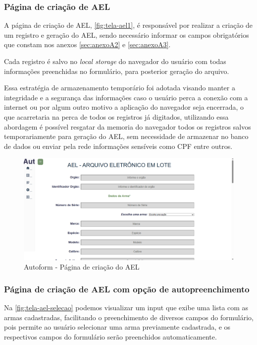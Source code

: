 \subsubsection{Página de criação de AEL}
A página de criação de AEL, \autoref{fig:tela-ael1}, é responsável por realizar a criação de um registro e geração do AEL, sendo necessário informar os campos obrigatórios que constam nos anexos \autoref{sec:anexoA2} e \autoref{sec:anexoA3}.

Cada registro é salvo no \textit{local storage} do navegador do usuário com todas informações preenchidas no formulário, para posterior geração do arquivo. 

Essa estratégia de armazenamento temporário foi adotada visando manter a integridade e a segurança das informações caso o usuário perca a conexão com a internet ou por algum outro motivo a aplicação do navegador seja encerrada, o que acarretaria na perca de todos os registros já digitados, utilizando essa abordagem é possível resgatar da memoria do navegador todos os registros salvos temporariamente para geração do AEL, sem necessidade de armazenar no banco de dados ou enviar pela rede informações sensíveis como CPF entre outros. 
\begin{figure}[htb]
    \caption{\label{fig:tela-ael1}Autoform - Página de criação do AEL}
    \begin{center}
        \includegraphics[scale=0.5]{imagens/autoform-ael-gerar.png}
    \end{center}
\end{figure}

\subsubsection{Página de criação de AEL com opção de autopreenchimento}
Na \autoref{fig:tela-ael-selecao} podemos visualizar um input que exibe uma lista com as armas cadastradas, facilitando o preenchimento de diversos campos do formulário,
pois permite ao usuário selecionar uma arma previamente cadastrada, e os respectivos campos do formulário serão preenchidos automaticamente.

